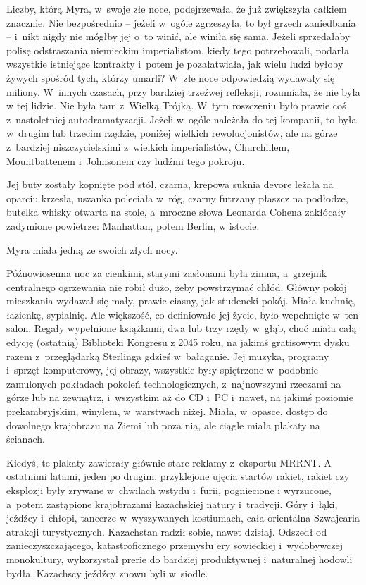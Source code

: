 \documentclass[oneside,polish,11pt,sfheadings]{mwbk}
\begin{document}
Liczby, którą Myra, w~swoje złe noce, podejrzewała, że już zwiększyła
całkiem znacznie. Nie bezpośrednio -- jeżeli w~ogóle zgrzeszyła, to był
grzech zaniedbania -- i~nikt nigdy nie mógłby jej o~to winić, ale winiła
się sama. Jeżeli sprzedałaby polisę odstraszania niemieckim
imperialistom, kiedy tego potrzebowali, podarła wszystkie istniejące
kontrakty i~potem je pozałatwiała, jak wielu ludzi byłoby żywych spośród
tych, którzy umarli? W~złe noce odpowiedzią wydawały się miliony. W~innych czasach, przy bardziej trzeźwej refleksji, rozumiała, że nie była
w tej lidzie. Nie była tam z~Wielką Trójką. W~tym roszczeniu było prawie
coś z~nastoletniej autodramatyzacji. Jeżeli w~ogóle należała do tej
kompanii, to była w~drugim lub trzecim rzędzie, poniżej wielkich
rewolucjonistów, ale na górze z~bardziej niszczycielskimi z~wielkich
imperialistów, Churchillem, Mountbattenem i~Johnsonem czy ludźmi tego
pokroju.

Jej buty zostały kopnięte pod stół, czarna, krepowa suknia devore 
leżała na oparciu krzesła, uszanka poleciała w~róg, czarny futrzany
płaszcz na podłodze, butelka whisky otwarta na stole, a~mroczne słowa
Leonarda Cohena zakłócały zadymione powietrze: Manhattan, potem Berlin,
w istocie.

Myra miała jedną ze swoich złych nocy.

Późnowiosenna noc za cienkimi, starymi zasłonami była zimna, a~grzejnik
centralnego ogrzewania nie robił dużo, żeby powstrzymać chłód. Główny
pokój mieszkania wydawał się mały, prawie ciasny, jak studencki pokój.
Miała kuchnię, łazienkę, sypialnię. Ale większość, co definiowało jej
życie, było wepchnięte w~ten salon. Regały wypełnione książkami, dwa lub
trzy rzędy w~głąb, choć miała całą edycję (ostatnią) Biblioteki Kongresu
z 2045 roku, na jakimś gratisowym dysku razem z~przeglądarką Sterlinga
gdzieś w~bałaganie. Jej muzyka, programy i~sprzęt komputerowy, jej
obrazy, wszystkie były spiętrzone w~podobnie zamulonych pokładach
pokoleń technologicznych, z~najnowszymi rzeczami na górze lub na
zewnątrz, i~wszystkim aż do CD i~PC i~nawet, na jakimś poziomie
prekambryjskim, winylem, w~warstwach niżej. Miała, w~opasce, dostęp do
dowolnego krajobrazu na Ziemi lub poza nią, ale ciągle miała plakaty na
ścianach.

Kiedyś, te plakaty zawierały głównie stare reklamy z~eksportu MRRNT. A
ostatnimi latami, jeden po drugim, przyklejone ujęcia startów rakiet,
rakiet czy eksplozji były zrywane w~chwilach wstydu i~furii, pogniecione
i wyrzucone, a~potem zastąpione krajobrazami kazachskiej natury i~tradycji. Góry i~łąki, jeźdźcy i~chłopi, tancerze w~wyszywanych
kostiumach, cała orientalna Szwajcaria atrakcji turystycznych.
Kazachstan radził sobie, nawet dzisiaj. Odszedł od zanieczyszczającego,
katastroficznego przemysłu ery sowieckiej i~wydobywczej monokultury,
wykorzystał prerie do bardziej produktywnej i~naturalnej hodowli bydła.
Kazachscy jeźdźcy znowu byli w~siodle.
\end{document}
